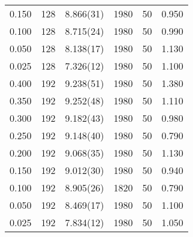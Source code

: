 \begin{tabular}{rrlrrr}
 0.150 &     128 & 8.866(31)  &                 1980 &                   50 &    0.950 \\
 0.100 &     128 & 8.715(24)  &                 1980 &                   50 &    0.990 \\
 0.050 &     128 & 8.138(17)  &                 1980 &                   50 &    1.130 \\
 0.025 &     128 & 7.326(12)  &                 1980 &                   50 &    1.100 \\
 0.400 &     192 & 9.238(51)  &                 1980 &                   50 &    1.380 \\
 0.350 &     192 & 9.252(48)  &                 1980 &                   50 &    1.110 \\
 0.300 &     192 & 9.182(43)  &                 1980 &                   50 &    0.980 \\
 0.250 &     192 & 9.148(40)  &                 1980 &                   50 &    0.790 \\
 0.200 &     192 & 9.068(35)  &                 1980 &                   50 &    1.130 \\
 0.150 &     192 & 9.012(30)  &                 1980 &                   50 &    0.940 \\
 0.100 &     192 & 8.905(26)  &                 1820 &                   50 &    0.790 \\
 0.050 &     192 & 8.469(17)  &                 1980 &                   50 &    1.100 \\
 0.025 &     192 & 7.834(12)  &                 1980 &                   50 &    1.050 \\
\hline
\end{tabular}
